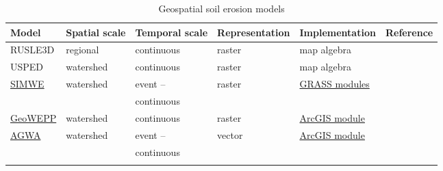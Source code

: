 \documentclass[gmd, manuscript]{copernicus}
\begin{document}

\begin{table}
\small
\caption{Geospatial soil erosion models}
\begin{tabu} to \textwidth {XXXXXl}
\toprule
Model & Spatial scale &  Temporal scale & Representation & Implementation & Reference\\
\midrule
RUSLE3D & regional & continuous & raster & map algebra & \citep{Mitasova1996}\\
USPED & watershed & continuous & raster & map algebra & \citep{Mitasova1996}\\
\href{https://grass.osgeo.org/grass74/manuals/r.sim.sediment.html}{SIMWE} & watershed & event -- & raster & \href{https://grass.osgeo.org/grass74/manuals/r.sim.sediment.html}{GRASS modules} & \citep{Mitas1998}\\
&& continuous\\
\href{http://geowepp.geog.buffalo.edu/}{GeoWEPP} & watershed & continuous & raster & \href{http://geowepp.geog.buffalo.edu/}{ArcGIS module} & \citep{Flanagan2013}\\
\href{https://www.tucson.ars.ag.gov/agwa/}{AGWA}  & watershed & event -- & vector & \href{https://www.tucson.ars.ag.gov/agwa/}{ArcGIS module} & \citep{Guertin2015}\\
&& continuous\\
\bottomrule
\\
\end{tabu}
\label{table:erosion_models}
\end{table}
\end{document}
